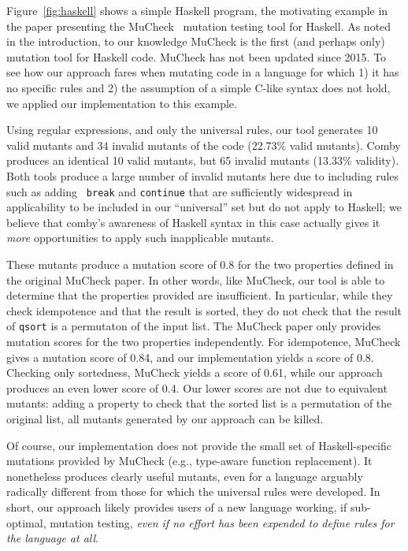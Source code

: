 \documentclass[sigconf,review, anonymous]{acmart}
\begin{document}
{\begin{figure}
\end{figure}

Figure~\ref{fig:haskell} shows a simple Haskell program, the
motivating example in the paper presenting the MuCheck~\cite{mucheck}
mutation testing tool for Haskell.  As noted in the introduction, to our
knowledge MuCheck is the first (and perhaps only) mutation tool for
Haskell code.  MuCheck has not been updated since 2015.
To see how our approach fares when mutating code in a language for
which 1) it has no specific rules and 2) the assumption of a simple
C-like syntax does not hold, we applied our implementation to this example.

Using regular expressions, and only the universal rules, our tool
generates 10 valid mutants and 34 invalid mutants of the code (22.73\%
valid mutants).  Comby produces an identical 10 valid mutants, but 65
invalid mutants (13.33\% validity).  Both tools produce a large number
of invalid mutants here due to including rules such as adding {\tt
  break} and {\tt continue} that are sufficiently widespread in
applicability to be included in our ``universal'' set but do not apply
to Haskell; we believe that comby's awareness of Haskell syntax in
this case actually gives it \emph{more} opportunities to apply such
inapplicable mutants.

These mutants produce a mutation
score of 0.8 for the two properties defined in the original MuCheck
paper.  In other words, like MuCheck, our tool is able to
determine that the properties provided are insufficient.  In
particular, while they check idempotence and that the result is
sorted, they do not check that the result of {\tt qsort} is a permutaton of the input
list.  The MuCheck paper only provides mutation scores for the two
properties independently.  For idempotence, MuCheck gives a mutation
score of 0.84, and our implementation yields a score of 0.8.  Checking
only sortedness, MuCheck yields a score of 0.61, while our approach
produces an even lower score of 0.4.  Our lower
scores are not due to equivalent mutants: adding a property to check
that the sorted list is a permutation of the original list, all
mutants generated by our approach can be killed.

Of course, our implementation does not provide the small set of Haskell-specific
mutations provided by MuCheck (e.g., type-aware function replacement).  It nonetheless produces clearly useful
mutants, even for a language arguably radically different from those
for which the universal rules were developed.  In short, our approach
likely provides users of a new language working, if sub-optimal, mutation testing,
\emph{even if no effort has been expended to define rules for the
  language at all}.

}
\end{document}
